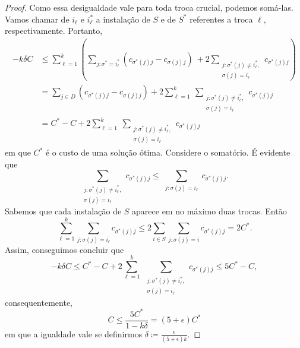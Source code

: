 \begin{proof}
Como essa desigualdade vale para toda troca crucial, podemos somá-las. Vamos chamar de $i_\ell$ e $i_\ell^*$ a instalação de $S$ e de $S^*$ referentes a troca $\ell$, respectivamente. Portanto,
\begin{subequations}
\begin{align*}
- k \delta C &\leq \sum_{\ell = 1}^k \left(  \sum_{j : \sigma^* = i_\ell^*} (c_{\sigma^*(j)j} - c_{\sigma(j)j}) \ + 2 \sum_{\substack{ j : \sigma^*(j)\neq i_\ell^*,\\  \sigma(j) = i_\ell}} c_{\sigma^*(j)j}     \right) \\
&= \sum_{j\in D} (c_{\sigma^*(j)j} - c_{\sigma(j)j}) + 2 \sum_{\ell = 1}^k \ \sum_{\substack{ j : \sigma^*(j)\neq i_\ell^*,\\  \sigma(j) = i_\ell}} c_{\sigma^*(j)j} \\
&= C^* - C + 2 \sum_{\ell = 1}^k \ \sum_{\substack{ j : \sigma^*(j)\neq i_\ell^*,\\  \sigma(j) = i_\ell}} c_{\sigma^*(j)j}
\end{align*}
\end{subequations}
em que $C^*$ é o custo de uma solução ótima. Considere o somatório. É evidente que 
\[\sum_{\substack{ j : \sigma^*(j)\neq i_\ell^*,\\  \sigma(j) = i_\ell}} c_{\sigma^*(j)j} \leq \sum_{\substack{j:\sigma(j) = i_\ell}} c_{\sigma^*(j)j}.\]
Sabemos que cada instalação de $S$ aparece em no máximo duas trocas. Então
\[ \sum_{\ell=1}^k \sum_{j: \sigma(j) = i_\ell} c_{\sigma^*(j)j} \leq 2\sum_{i \in S} \sum_{j: \sigma(j) = i} c_{\sigma^*(j)j} = 2 C^*.\]
Assim, conseguimos concluir que 
\[ - k \delta C \leq C^* - C + 2 \sum_{\ell = 1}^k \ \sum_{\substack{ j : \sigma^*(j)\neq i_\ell^*,\\  \sigma(j) = i_\ell}} c_{\sigma^*(j)j} \leq 5C^* - C,\]
consequentemente, 
\[C \leq \frac{5C^*}{1 - k\delta} = (5+\epsilon)C^*\]
em que a igualdade vale se definirmos $\delta \coloneqq \frac{\epsilon}{(5+\epsilon)k}$.
\end{proof}

